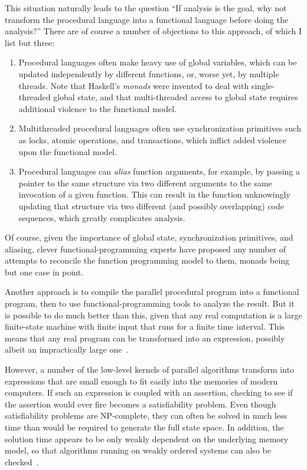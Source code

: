 This situation naturally leads to the question ``If analysis is the goal,
why not transform the procedural language into a functional language before
doing the analysis?''
There are of course a number of objections to this approach, of which
I list but three:

\begin{enumerate}
\item	Procedural languages often make heavy use of global variables,
	which can be updated independently by different
	functions, or, worse yet, by multiple threads.
	Note that Haskell's \emph{monads} were invented to deal with
	single-threaded global state, and that multi-threaded access to
	global state requires additional violence to the functional model.
\item	Multithreaded procedural languages often use synchronization
	primitives such as locks, atomic operations, and transactions,
	which inflict added violence upon the functional model.
\item	Procedural languages can \emph{alias} function arguments,
	for example, by passing a pointer to the same structure via two
	different arguments to the same invocation of a given function.
	This can result in the function unknowingly updating that
	structure via two different (and possibly overlapping) code
	sequences, which greatly complicates analysis.
\end{enumerate}

Of course, given the importance of global state, synchronization
primitives, and aliasing, clever functional-programming experts have
proposed any number of attempts to reconcile the function programming
model to them, monads being but one case in point.

Another approach is to compile the parallel procedural program into
a functional program, then to use functional-programming tools to analyze
the result.
But it is possible to do much better than this, given that any real
computation is a large finite-state machine with finite input that
runs for a finite time interval.
This means that any real program can be transformed into an expression,
possibly albeit an impractically large one~\cite{VijayDSilva2012-sas}.

However, a number of the low-level kernels of parallel algorithms transform
into expressions that are small enough to fit easily into the memories
of modern computers.
If such an expression is coupled with an assertion, checking to see if
the assertion would ever fire becomes a satisfiability problem.
Even though satisfiability problems are NP-complete, they can often
be solved in much less time than would be required to generate the
full state space.
In addition, the solution time appears to be only weakly dependent on
the underlying memory model, so that algorithms running on weakly ordered
systems can also be checked~\cite{JadeAlglave2013-cav}.

